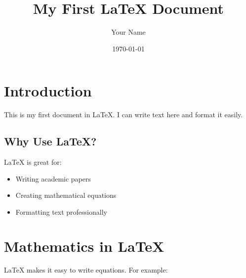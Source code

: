 \documentclass{article}
\title{My First LaTeX Document}
\author{Your Name}
\date{\today}
\begin{document}
\maketitle

\section{Introduction}

This is my first document in \LaTeX{}. I can write text here and format it easily.

\subsection{Why Use LaTeX?}
LaTeX is great for:

\begin{itemize}
    \item Writing academic papers
    \item Creating mathematical equations
    \item Formatting text professionally
\end{itemize}

\section{Mathematics in LaTeX} %
LaTeX makes it easy to write equations. For example:
\end{document}
